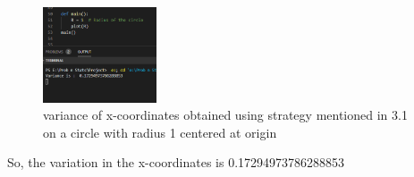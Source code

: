 \documentclass[answers]{exam}
\begin{document}
\begin{framed}
    \begin{figure}[H] %
    \centering
    \includegraphics[width= 0.3\textwidth]{Q3.1_variance.PNG}
    \caption{variance of x-coordinates obtained using strategy mentioned in 3.1 on a circle with radius 1 centered at origin}
    \end{figure}
    
    So, the variation in the x-coordinates is 0.17294973786288853 \\
\end{framed}
\newpage
\end{document}
